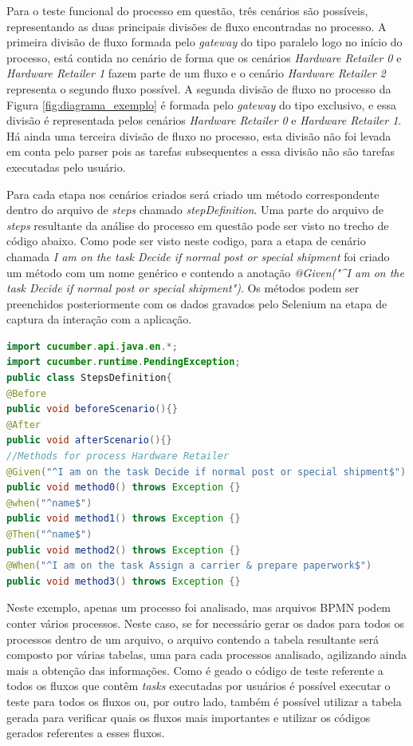 \documentclass[12pt]{article}
\begin{document}
Para o teste funcional do processo em questão, três cenários são possíveis, representando as duas principais divisões de fluxo encontradas no processo. A primeira divisão de fluxo formada pelo \emph{gateway} do tipo paralelo logo no início do processo, está contida no cenário de forma que os cenários \emph{Hardware Retailer 0} e \emph{Hardware Retailer 1} fazem parte de um fluxo e o cenário \emph{Hardware Retailer 2} representa o segundo fluxo possível. A segunda divisão de fluxo no processo da Figura \ref{fig:diagrama_exemplo} é formada pelo \emph{gateway} do tipo exclusivo, e essa divisão é representada pelos cenários \emph{Hardware Retailer 0} e \emph{Hardware Retailer 1}. Há ainda uma terceira divisão de fluxo no processo, esta divisão não foi levada em conta pelo parser pois as tarefas subsequentes a essa divisão não são tarefas executadas pelo usuário.

Para cada etapa nos cenários criados será criado um método correspondente dentro do arquivo de \emph{steps} chamado \emph{stepDefinition}. Uma parte do arquivo de \emph{steps} resultante da análise do processo em questão pode ser visto no trecho de código abaixo. Como pode ser visto neste codigo, para a etapa de cenário chamada \emph{I am on the task Decide if normal post or special shipment} foi criado um método com um nome genérico e contendo a anotação \emph{@Given("\^{}I am on the task Decide if normal post or special shipment\textdollar{}")}. Os métodos podem ser preenchidos posteriormente com os dados gravados pelo Selenium na etapa de captura da interação com a aplicação.

\begin{lstlisting}[language=Java]
import cucumber.api.java.en.*;
import cucumber.runtime.PendingException;
public class StepsDefinition{
@Before
public void beforeScenario(){}
@After
public void afterScenario(){} 
//Methods for process Hardware Retailer
@Given("^I am on the task Decide if normal post or special shipment$") 
public void method0() throws Exception {} 
@when("^name$") 
public void method1() throws Exception {} 
@Then("^name$") 
public void method2() throws Exception {} 
@When("^I am on the task Assign a carrier & prepare paperwork$") 
public void method3() throws Exception {} 
\end{lstlisting}

Neste exemplo, apenas um processo foi analisado, mas arquivos BPMN podem conter vários processos. Neste caso, se for necessário gerar os dados para todos os processos dentro de um arquivo, o arquivo contendo a tabela resultante será composto por várias tabelas, uma para cada processos analisado, agilizando ainda mais a obtenção das informações. Como é geado o código de teste referente a todos os fluxos que contêm \emph{tasks} executadas por usuários é possível executar o teste para todos os fluxos ou, por outro lado, também é possível utilizar a tabela gerada para verificar quais os fluxos mais importantes e utilizar os códigos gerados referentes a esses fluxos.
\end{document}
